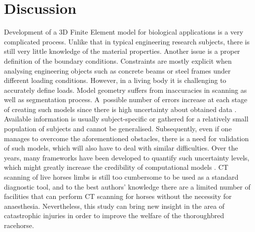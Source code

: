 \documentclass[11pt]{ACMEarticle}
\numberwithin{equation}{section}
\begin{document}

\section{Discussion}\label{sec:discussion}
Development of a 3D Finite Element model for biological applications is a very complicated process. Unlike that in typical engineering research subjects, there is still very little knowledge of the material properties. Another issue is a proper definition of the boundary conditions. Constraints are mostly explicit when analysing engineering objects such as concrete beams or steel frames under different loading conditions. However, in a living body it is challenging to accurately define loads. Model geometry suffers from inaccuracies in scanning as well as segmentation process. A~possible number of errors increase at each stage of creating such models since there is high uncertainty about obtained data \citep{campoli2014effects}. Available information is usually subject-specific or gathered for a relatively small population of subjects and cannot be generalised. Subsequently, even if one manages to overcome the aforementioned obstacles, there is a need for validation of such models, which will also have to deal with similar difficulties. Over the years, many frameworks have been developed to quantify such uncertainty levels, which might greatly increase the credibility of computational models \citep{wille2016uncertainty}. CT scanning of live horses limbs is still too cumbersome to be used as a standard diagnostic tool, and to the best authors' knowledge there are a limited number of facilities that can perform CT scanning for horses without the necessity for anaesthesia. Nevertheless, this study can bring new insight in the area of catastrophic injuries in order to improve the welfare of the thoroughbred racehorse. %
\end{document}

